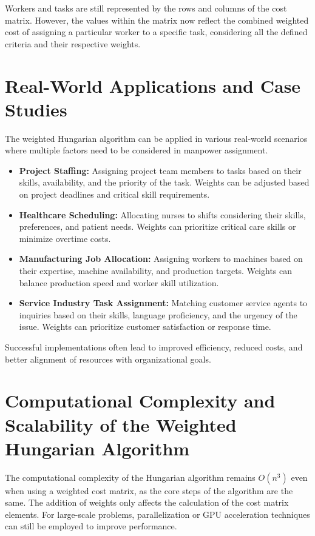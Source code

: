\documentclass{article}
\begin{document}
Workers and tasks are still represented by the rows and columns of the cost matrix. However, the values within the matrix now reflect the combined weighted cost of assigning a particular worker to a specific task, considering all the defined criteria and their respective weights.

\section{Real-World Applications and Case Studies}

The weighted Hungarian algorithm can be applied in various real-world scenarios where multiple factors need to be considered in manpower assignment.

\begin{itemize}
    \item \textbf{Project Staffing:} Assigning project team members to tasks based on their skills, availability, and the priority of the task. Weights can be adjusted based on project deadlines and critical skill requirements.
    \item \textbf{Healthcare Scheduling:} Allocating nurses to shifts considering their skills, preferences, and patient needs. Weights can prioritize critical care skills or minimize overtime costs.
    \item \textbf{Manufacturing Job Allocation:} Assigning workers to machines based on their expertise, machine availability, and production targets. Weights can balance production speed and worker skill utilization.
    \item \textbf{Service Industry Task Assignment:} Matching customer service agents to inquiries based on their skills, language proficiency, and the urgency of the issue. Weights can prioritize customer satisfaction or response time.
\end{itemize}

Successful implementations often lead to improved efficiency, reduced costs, and better alignment of resources with organizational goals.

\section{Computational Complexity and Scalability of the Weighted Hungarian Algorithm}

The computational complexity of the Hungarian algorithm remains $O(n^3)$ even when using a weighted cost matrix, as the core steps of the algorithm are the same. The addition of weights only affects the calculation of the cost matrix elements. For large-scale problems, parallelization or GPU acceleration techniques can still be employed to improve performance.
\end{document}
